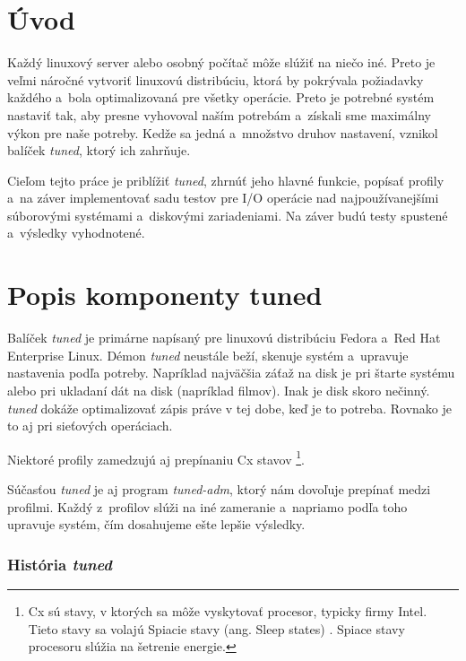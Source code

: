 %
%

\chapter{Úvod}

Každý linuxový server alebo osobný počítač môže slúžiť na niečo iné. Preto je
veľmi náročné vytvoriť linuxovú distribúciu, ktorá by pokrývala požiadavky
každého a~bola optimalizovaná pre všetky operácie. Preto je potrebné systém
nastaviť tak, aby presne vyhovoval naším potrebám a~získali sme maximálny výkon
pre naše potreby. Kedže sa jedná a~množstvo druhov nastavení, vznikol balíček
\emph{tuned}\cite{tunedHomepage}, ktorý ich zahrňuje.

Cieľom tejto práce je priblížiť \emph{tuned}, zhrnúť jeho hlavné funkcie,
popísať profily a~na záver implementovať sadu testov pre I/O operácie nad
najpoužívanejšími súborovými systémami a~diskovými zariadeniami. Na záver budú
testy spustené a~výsledky vyhodnotené.

%
%

\chapter{Popis komponenty tuned}

Balíček \emph{tuned} je primárne napísaný pre linuxovú distribúciu
Fedora\cite{fedoraHomepage} a~Red Hat Enterprise Linux. Démon \emph{tuned} neustále
beží, skenuje systém a~upravuje nastavenia podľa potreby. Napríklad najväčšia
záťaž na disk je pri štarte systému alebo pri ukladaní dát na disk (napríklad
filmov). Inak je disk skoro nečinný. \emph{tuned} dokáže optimalizovať zápis práve v
tej dobe, keď je to potreba. Rovnako je to aj pri sieťových operáciach.

Niektoré profily zamedzujú aj prepínaniu Cx stavov \footnote{Cx sú stavy, v
ktorých sa môže vyskytovať procesor, typicky firmy Intel. Tieto stavy sa volajú
Spiacie stavy (ang. Sleep states) \cite{sleepStates}. Spiace stavy procesoru
slúžia na šetrenie energie.}.

Súčasťou \emph{tuned} je aj program \emph{tuned-adm}, ktorý nám dovoľuje
prepínať medzi profilmi. Každý z~profilov slúži na iné zameranie a~napriamo
podľa toho upravuje systém, čím dosahujeme ešte lepšie výsledky.

%
%

\subsection{História \emph{tuned}}
\label{sec:historiaTuned}

